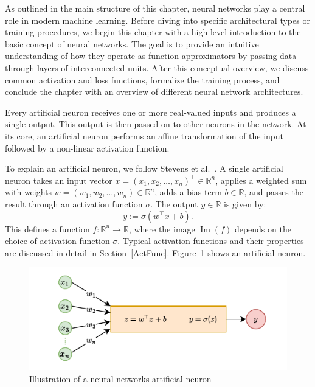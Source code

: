 As outlined in the main structure of this chapter, neural networks play a central role in modern machine learning.
Before diving into specific architectural types or training procedures, we begin this chapter with a high-level introduction to the basic concept of neural networks.
The goal is to provide an intuitive understanding of how they operate as function approximators by passing data through layers of interconnected units.
After this conceptual overview, we discuss common activation and loss functions, formalize the training process, and conclude the chapter with an overview of different neural network architectures.

Every artificial neuron receives one or more real-valued inputs and produces a single output.
This output is then passed on to other neurons in the network. 
At its core, an artificial neuron performs an affine transformation of the input followed by a non-linear activation function.

To explain an artificial neuron, we follow Stevens et al.~\cite{antiga_deep_2020}.  
A single artificial neuron takes an input vector \( x = (x_1, x_2, \dots, x_n)^\top \in \mathbb{R}^n \), applies a weighted sum with weights \( w = (w_1, w_2, \dots, w_n) \in \mathbb{R}^n \), adds a bias term \( b \in \mathbb{R} \), and passes the result through an activation function \( \sigma \).  
The output \( y \in \mathbb{R} \) is given by:
\[
y := \sigma(w^\top x + b).
\]
This defines a function \( f \colon \mathbb{R}^n \to \mathbb{R} \), where the image \( \operatorname{Im}(f) \) depends on the choice of activation function \( \sigma \).  
Typical activation functions and their properties are discussed in detail in Section~\ref{ActFunc}.  
Figure~\ref{fig:artNeuron} shows an artificial neuron.




\begin{figure}[h]
    \centering
    \includegraphics[width=0.7\linewidth]{Abschlussarbeit/Pictures/ArtificialNeuron_output.pdf}
    \caption{Illustration of a neural networks artificial neuron}
    \label{fig:artNeuron}
\end{figure}

